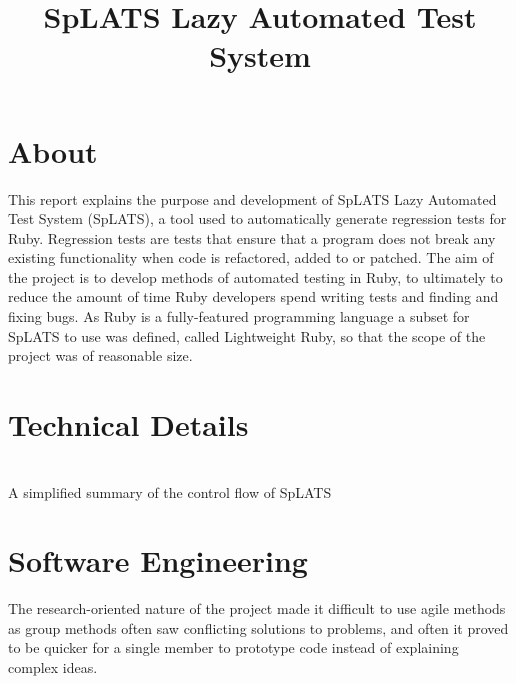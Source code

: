 \documentclass{report}
\begin{document}
\title{SpLATS Lazy Automated Test System}


\section*{About}

This report explains the purpose and development of SpLATS Lazy Automated Test System (SpLATS), a tool used to automatically generate regression tests for Ruby.  Regression tests are tests that ensure that a program does not break any existing functionality when code is refactored, added to or patched. The aim of the project is to develop methods of automated testing in Ruby, to ultimately to reduce the amount of time Ruby developers spend writing tests and finding and fixing bugs. As Ruby is a fully-featured programming language a subset for SpLATS to use was defined, called Lightweight Ruby, so that the scope of the project was of reasonable size.




\section*{Technical Details}

\\
{A simplified summary of the control flow of SpLATS} \\


\section*{Software Engineering}

The research-oriented nature of the project made it difficult to use agile methods as group methods often saw conflicting solutions to problems, and often it proved to be quicker for a single member to prototype code instead of explaining complex ideas.
\end{document}
